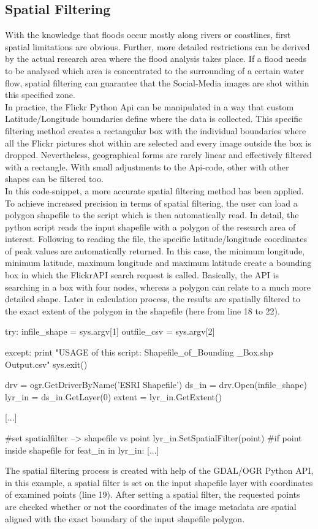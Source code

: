 \subsection{Spatial Filtering}
With the knowledge that floods occur mostly along rivers or coastlines, first spatial limitations are obvious. Further, more detailed restrictions can be derived by the actual research area where the flood analysis takes place. If a flood needs to be analysed which area is concentrated to the surrounding of a certain water flow, spatial filtering can guarantee that the Social-Media images are shot within this specified zone. \\
In practice, the Flickr Python Api can be manipulated in a way that custom Latitude/Longitude boundaries define where the data is collected. This specific filtering method creates a rectangular box with the individual boundaries where all the Flickr pictures shot within are selected and every image outside the box is dropped. Nevertheless, geographical forms are rarely linear and effectively filtered with a rectangle. With small adjustments to the Api-code, other with other shapes can be filtered too.\\ 
In this code-snippet, a more accurate spatial filtering method has been applied. To achieve increased precision in terms of spatial filtering, the user can load a polygon shapefile to the script which is then automatically read. In detail, the python script reads the input shapefile with a polygon of the research area of interest. Following to reading the file, the specific latitude/longitude coordinates of peak values are automatically returned. In this case, the minimum longitude, minimum latitude, maximum longitude and maximum latitude create a bounding box in which the FlickrAPI search request is called. Basically, the API is searching in a box with four nodes, whereas a polygon can relate to a much more detailed shape. Later in calculation process, the results are spatially filtered to the exact extent of the polygon in the shapefile (here from line 18 to 22).\\

\begin{python}[linewidth=16cm]
[...]
try:
    infile_shape = sys.argv[1]	
    outfile_csv = sys.argv[2]
    
except:
	print "USAGE of this script: Shapefile_of_Bounding
	_Box.shp Output.csv"
	sys.exit()
 
drv = ogr.GetDriverByName('ESRI Shapefile')
ds_in = drv.Open(infile_shape)
lyr_in = ds_in.GetLayer(0)
extent = lyr_in.GetExtent()

[...]

#set spatialfilter --> shapefile vs point
lyr_in.SetSpatialFilter(point)
#if point inside shapefile
for feat_in in lyr_in:
	[...]

\end{python}
The spatial filtering process is created with help of the GDAL/OGR Python API, in this example, a spatial filter is set on the input shapefile layer with coordinates of examined points (line 19). After setting a spatial filter, the requested points are checked whether or not the coordinates of the image metadata are spatial aligned with the exact boundary of the input shapefile polygon.  

